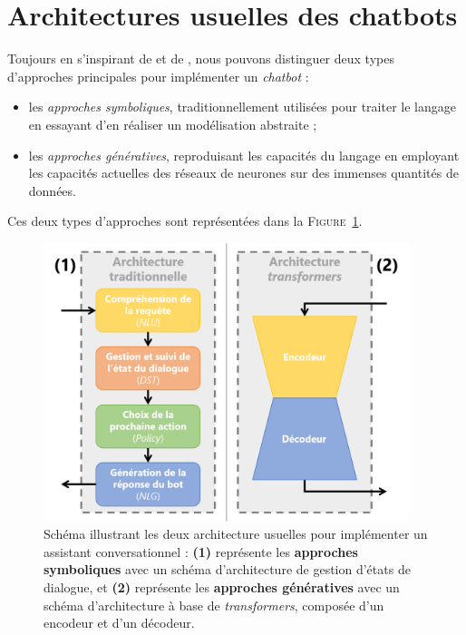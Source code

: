 	
	\section{Architectures usuelles des chatbots}
	\label{annex:B.2-CHATBOT-ARCHITECTURES}

		Toujours en s'inspirant de \cite{chen-etal:2017:survey-dialogue-systems} et de \cite{adamopoulou-moussiades:2020:overview-chatbot-technology}, nous pouvons distinguer deux types d'approches principales pour implémenter un \textit{chatbot} :
		\begin{itemize}
			\item les \textit{approches symboliques}, traditionnellement utilisées pour traiter le langage en essayant d'en réaliser un modélisation abstraite ;
			\item les \textit{approches génératives}, reproduisant les capacités du langage en employant les capacités actuelles des réseaux de neurones sur des immenses quantités de données.
		\end{itemize}
		
		Ces deux types d'approches sont représentées dans la \textsc{Figure~\ref{figure:B.2-CHATBOT-ARCHITECTURES}}.
		\begin{figure}[!htb]
			\centering
			\includegraphics[width=0.95\textwidth]{figures/annexe-chatbots-architectures}
			\caption{
				Schéma illustrant les deux architecture usuelles pour implémenter un assistant conversationnel :
				\textbf{(1)} représente les \textbf{approches symboliques} avec un schéma d'architecture de gestion d'états de dialogue,
				et \textbf{(2)} représente les \textbf{approches génératives} avec un schéma d'architecture à base de \textit{transformers}, composée d'un encodeur et d'un décodeur.
			}
			\label{figure:B.2-CHATBOT-ARCHITECTURES}
		\end{figure}
		
